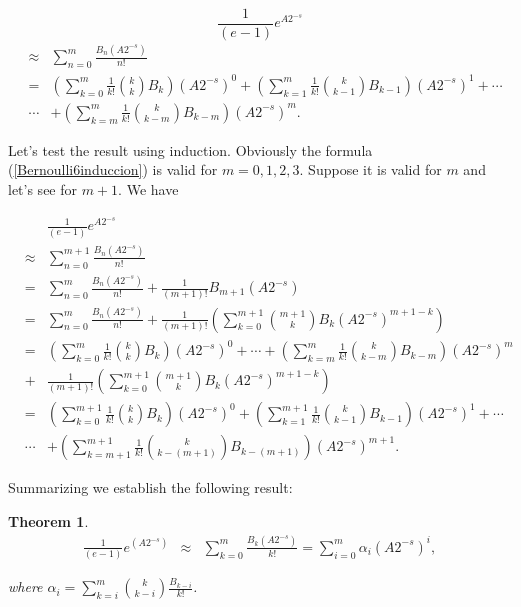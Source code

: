 \documentclass[preprint,10pt]{elsarticle}
\newtheorem{Theorem}{\bf Theorem}[section]
\begin{document}
$$
\frac{1}{\left(e-1 \right)}e^{A 2^{-s}} 
$$
\begin{eqnarray}\label{Bernoulli6induccion}
 & \approx & \sum_{n=0}^m \frac{B_n\left(A 2^{-s}\right)}{n!} \nonumber \\
&=& \left(\sum_{k=0}^{m} \frac{1}{k!} {k \choose k} B_k \right) \left(A 2^{-s}\right)^0 + \left(\sum_{k=1}^{m} \frac{1}{k!} {k \choose k-1} B_{k-1} \right) \left(A 2^{-s}\right)^1+\cdots \nonumber \\
&\cdots& + \left(\sum_{k=m}^{m} \frac{1}{k!} {k \choose k-m} B_{k-m} \right) \left(A 2^{-s}\right)^m.
\end{eqnarray}

Let's test the result using induction. Obviously the formula (\ref{Bernoulli6induccion}) is valid for $m=0,1,2,3$. Suppose it is valid for $m$ and let's see for $m+1$. We have


\begin{eqnarray*}
& & \frac{1}{\left(e-1 \right)}e^{A 2^{-s}}  \\
& \approx & \sum_{n=0}^{m+1} \frac{B_n\left(A 2^{-s}\right)}{n!} \\
& = & \sum_{n=0}^{m} \frac{B_n\left(A 2^{-s}\right)}{n!}+\frac{1}{(m+1)!} B_{m+1}\left(A 2^{-s}\right) \\
& = &  \sum_{n=0}^{m} \frac{B_n\left(A 2^{-s}\right)}{n!}+\frac{1}{(m+1)!}\left(  \sum_{k=0}^{m+1} {m+1 \choose k} B_k \left(A 2^{-s}\right)^{m+1-k} \right)\\
&=& \!\!\left(\sum_{k=0}^{m} \frac{1}{k!} {k \choose k} B_k \right)\!\!\left(\!A 2^{-s}\right)^0+\cdots+\!\left(\sum_{k=m}^{m} \frac{1}{k!} {k \choose k\!-\!m} B_{k-m} \right)\!\!\left(\!A 2^{-s}\right)^m\\
&+& \frac{1}{(m+1)!}\left(  \sum_{k=0}^{m+1} {m+1 \choose k} B_k \left(A 2^{-s}\right)^{m+1-k} \right) \\
&=& \left(\sum_{k=0}^{m+1} \frac{1}{k!} {k \choose k} B_k \right)\!\!\left(\!A 2^{-s}\right)^0\!+\!\left(\sum_{k=1}^{m+1} \frac{1}{k!} {k \choose k\!-\!1} B_{k-1} \right)\!\!\left(\!A 2^{-s}\right)^1\!+\cdots \\
&\cdots& +\left(\sum_{k=m+1}^{m+1} \frac{1}{k!} {k \choose k\!-\!(m\!+\!1)} B_{k-(m+1)} \right)\!\!\left(A 2^{-s}\right)^{m+1}.
\end{eqnarray*}

Summarizing we establish the following result:

\begin{Theorem}
\begin{eqnarray}\label{miaBernoulli1}
\frac{1}{\left(e-1 \right)}e^{\left(A 2^{-s}\right)} &\approx &  \sum_{k=0}^m \frac{B_k\left(A 2^{-s}\right)}{k!}= \sum_{i=0}^m \alpha_{i} \left(A 2^{-s}\right)^{i},
\end{eqnarray}

where $\displaystyle \alpha_{i} = \sum_{k=i}^{m} {k \choose k-i} \frac{B_{k-i}}{k!}$.
\end{Theorem}
\end{document}
